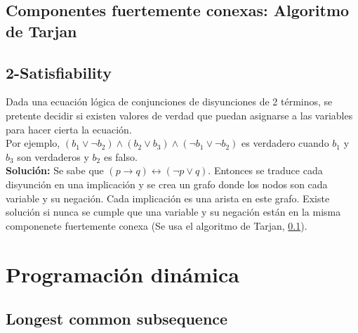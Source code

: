 \documentclass[10pt,letterpaper,twocolumn,twosided]{article}
\newcommand{\codigofuente}[1]{

\dotfill
}
\begin{document}
\subsection{Componentes fuertemente conexas: Algoritmo de Tarjan}
\label{tarjan}
\codigofuente{./src/grafos/tarjan.cpp}

\subsection{2-Satisfiability}
Dada una ecuación lógica de conjunciones de disyunciones de 2 términos, se pretente decidir si existen valores de verdad que puedan asignarse a las variables para hacer cierta la ecuación. \\
Por ejemplo, $(b_1 \vee \neg b_2) \wedge (b_2 \vee b_3) \wedge (\neg b_1 \vee \neg b_2) $ es verdadero cuando $b_1$ y $b_3$ son verdaderos y $b_2$ es falso. \\
\textbf{Solución:} Se sabe que $(p \rightarrow q) \leftrightarrow (\neg p \vee q)$. Entonces se traduce cada disyunción en una implicación y se crea un grafo donde los nodos son cada variable y su negación. Cada implicación es una arista en este grafo. Existe solución si nunca se cumple que una variable y su negación están en la misma componenete fuertemente conexa (Se usa el algoritmo de Tarjan, \ref{tarjan}).

\section{Programación dinámica}
\subsection{Longest common subsequence}
\codigofuente{./src/dp/lcs.cpp}
\end{document}
